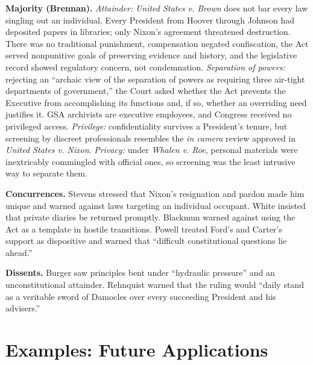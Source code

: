 \documentclass[12pt]{article}
\begin{document}
\textbf{Majority (Brennan).} \emph{Attainder:} \textit{United States v. Brown} does not bar every law singling out an individual. Every President from Hoover through Johnson had deposited papers in libraries; only Nixon's agreement threatened destruction. There was no traditional punishment, compensation negated confiscation, the Act served nonpunitive goals of preserving evidence and history, and the legislative record showed regulatory concern, not condemnation. \emph{Separation of powers:} rejecting an ``archaic view of the separation of powers as requiring three air-tight departments of government,'' the Court asked whether the Act prevents the Executive from accomplishing its functions and, if so, whether an overriding need justifies it. GSA archivists are executive employees, and Congress received no privileged access. \emph{Privilege:} confidentiality survives a President's tenure, but screening by discreet professionals resembles the \textit{in camera} review approved in \textit{United States v. Nixon}. \emph{Privacy:} under \textit{Whalen v. Roe}, personal materials were inextricably commingled with official ones, so screening was the least intrusive way to separate them.

\textbf{Concurrences.} Stevens stressed that Nixon's resignation and pardon made him unique and warned against laws targeting an individual occupant. White insisted that private diaries be returned promptly. Blackmun warned against using the Act as a template in hostile transitions. Powell treated Ford's and Carter's support as dispositive and warned that ``difficult constitutional questions lie ahead.''

\textbf{Dissents.} Burger saw principles bent under ``hydraulic pressure'' and an unconstitutional attainder. Rehnquist warned that the ruling would ``daily stand as a veritable sword of Damocles over every succeeding President and his advisers.''

\section{Examples: Future Applications}
\end{document}

